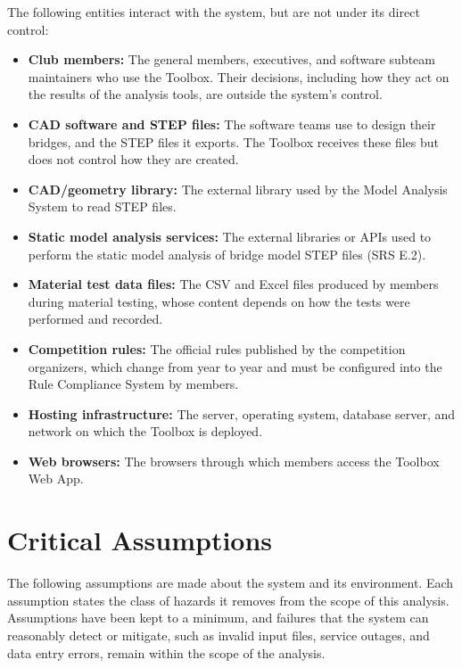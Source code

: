 \documentclass{article}
\begin{document}
The following entities interact with the system, but are not under its direct
control:

\begin{itemize}
    \item \textbf{Club members:} The general members, executives, and software
    subteam maintainers who use the Toolbox. Their decisions, including how they
    act on the results of the analysis tools, are outside the system's control.
    \item \textbf{CAD software and STEP files:} The software teams use to design
    their bridges, and the STEP files it exports. The Toolbox receives these
    files but does not control how they are created.
    \item \textbf{CAD/geometry library:} The external library used by the Model
    Analysis System to read STEP files.
    \item \textbf{Static model analysis services:} The external libraries or APIs used to perform
    the static model analysis of bridge model STEP files (SRS E.2).
    \item \textbf{Material test data files:} The CSV and Excel files produced by
    members during material testing, whose content depends on how the tests
    were performed and recorded.
    \item \textbf{Competition rules:} The official rules published by the
    competition organizers, which change from year to year and must be
    configured into the Rule Compliance System by members.
    \item \textbf{Hosting infrastructure:} The server, operating system, database
    server, and network on which the Toolbox is deployed.
    \item \textbf{Web browsers:} The browsers through which members access the
    Toolbox Web App.
\end{itemize}

\section{Critical Assumptions}

The following assumptions are made about the system and its environment. Each
assumption states the class of hazards it removes from the scope of this
analysis. Assumptions have been kept to a minimum, and failures that the system
can reasonably detect or mitigate, such as invalid input files, service
outages, and data entry errors, remain within the scope of the analysis.
\end{document}
